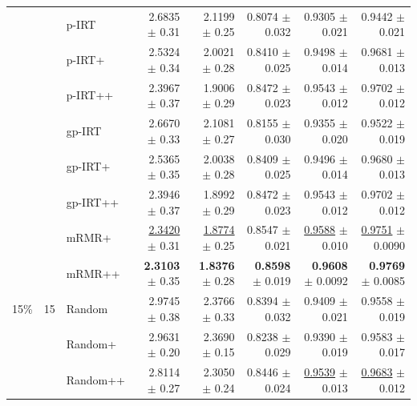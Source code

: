 \begin{longtable}{llp{}rrrrr}
 &  & p-IRT & 2.6835 {\scriptsize $\pm$ 0.31} & 2.1199 {\scriptsize $\pm$ 0.25} & 0.8074 {\scriptsize $\pm$ 0.032} & 0.9305 {\scriptsize $\pm$ 0.021} & 0.9442 {\scriptsize $\pm$ 0.021} \\
 &  & p-IRT+ & 2.5324 {\scriptsize $\pm$ 0.34} & 2.0021 {\scriptsize $\pm$ 0.28} & 0.8410 {\scriptsize $\pm$ 0.025} & 0.9498 {\scriptsize $\pm$ 0.014} & 0.9681 {\scriptsize $\pm$ 0.013} \\
 &  & p-IRT++ & 2.3967 {\scriptsize $\pm$ 0.37} & 1.9006 {\scriptsize $\pm$ 0.29} & 0.8472 {\scriptsize $\pm$ 0.023} & 0.9543 {\scriptsize $\pm$ 0.012} & 0.9702 {\scriptsize $\pm$ 0.012} \\
 &  & gp-IRT & 2.6670 {\scriptsize $\pm$ 0.33} & 2.1081 {\scriptsize $\pm$ 0.27} & 0.8155 {\scriptsize $\pm$ 0.030} & 0.9355 {\scriptsize $\pm$ 0.020} & 0.9522 {\scriptsize $\pm$ 0.019} \\
 &  & gp-IRT+ & 2.5365 {\scriptsize $\pm$ 0.35} & 2.0038 {\scriptsize $\pm$ 0.28} & 0.8409 {\scriptsize $\pm$ 0.025} & 0.9496 {\scriptsize $\pm$ 0.014} & 0.9680 {\scriptsize $\pm$ 0.013} \\
 &  & gp-IRT++ & 2.3946 {\scriptsize $\pm$ 0.37} & 1.8992 {\scriptsize $\pm$ 0.29} & 0.8472 {\scriptsize $\pm$ 0.023} & 0.9543 {\scriptsize $\pm$ 0.012} & 0.9702 {\scriptsize $\pm$ 0.012} \\
 &  & mRMR+ & \underline{2.3420} {\scriptsize $\pm$ 0.31} & \underline{1.8774} {\scriptsize $\pm$ 0.25} & 0.8547 {\scriptsize $\pm$ 0.021} & \underline{0.9588} {\scriptsize $\pm$ 0.010} & \underline{0.9751} {\scriptsize $\pm$ 0.0090} \\
 &  & mRMR++ & \textbf{2.3103} {\scriptsize $\pm$ 0.35} & \textbf{1.8376} {\scriptsize $\pm$ 0.28} & \textbf{0.8598} {\scriptsize $\pm$ 0.019} & \textbf{0.9608} {\scriptsize $\pm$ 0.0092} & \textbf{0.9769} {\scriptsize $\pm$ 0.0085} \\
\midrule
15\% & 15 & Random & 2.9745 {\scriptsize $\pm$ 0.38} & 2.3766 {\scriptsize $\pm$ 0.33} & 0.8394 {\scriptsize $\pm$ 0.032} & 0.9409 {\scriptsize $\pm$ 0.021} & 0.9558 {\scriptsize $\pm$ 0.019} \\
 &  & Random+ & 2.9631 {\scriptsize $\pm$ 0.20} & 2.3690 {\scriptsize $\pm$ 0.15} & 0.8238 {\scriptsize $\pm$ 0.029} & 0.9390 {\scriptsize $\pm$ 0.019} & 0.9583 {\scriptsize $\pm$ 0.017} \\
 &  & Random++ & 2.8114 {\scriptsize $\pm$ 0.27} & 2.3050 {\scriptsize $\pm$ 0.24} & 0.8446 {\scriptsize $\pm$ 0.024} & \underline{0.9539} {\scriptsize $\pm$ 0.013} & \underline{0.9683} {\scriptsize $\pm$ 0.012} \\

\end{longtable}
